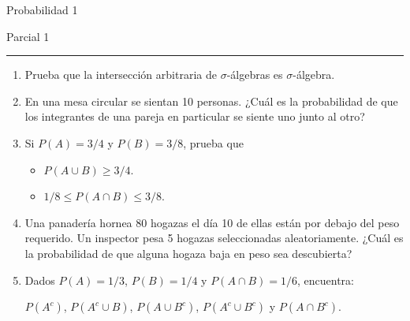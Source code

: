 \documentclass[12pt]{report}
\begin{document}
\begin{center}
    \textsf{\Large Probabilidad 1}
    \par\medskip
    \textsf{\large Parcial 1}
\end{center}
\hrule
\par\bigskip

\begin{enumerate}
    \item Prueba que la intersección arbitraria de $\sigma$-álgebras es $\sigma$-álgebra.
    \item En una mesa circular se sientan 10 personas. ¿Cuál es la probabilidad de que los integrantes de una pareja en particular se siente uno junto al otro?
    \item Si $P(A) = 3/4$ y $P(B) = 3/8$, prueba que 
    \begin{itemize}
        \item $P(A \cup B) \geq 3/4$.
        \item $1/8 \leq P(A\cap B) \leq 3/8$.
    \end{itemize}
    \item Una panadería hornea 80 hogazas el día 10 de ellas están por debajo del peso requerido. Un inspector pesa 5 hogazas seleccionadas aleatoriamente. ¿Cuál es la probabilidad de que alguna hogaza baja en peso sea descubierta?
    \item Dados $P(A) = 1/3$, $P(B) = 1/4$ y $P(A\cap B) = 1/6$, encuentra: 
    
    $P(A^c)$, $P(A^c\cup B)$, $P(A\cup B^c)$, $P(A^c\cup B^c)$ y $P(A\cap B^c)$.
    
\end{enumerate}
\end{document}
